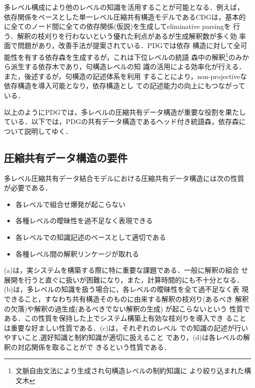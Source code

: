 多レベル構成により他のレベルの知識を活用することが可能となる．例えば，
依存関係をベースとした単一レベル圧縮共有構造モデルであるCDGは，基本的
に全てのノード間に全ての依存関係(仮説)を生成してeliminative parsingを
行う．解釈の枝刈りを行わないという優れた利点があるが生成解釈数が多く効
率面で問題があり，改善手法が提案されている\cite{Harper99}．PDGでは依存
構造に対して全可能性を有する依存森を生成するが，これは下位レベルの統語
森中の解釈\footnote{文脈自由文法により生成され句構造レベルの制約知識に
より絞り込まれた構文木}のみから派生する依存木であり，句構造レベルの知
識の活用による効率化が行える．また，後述するが，句構造の記述体系を利用
することにより，non-projectiveな依存構造を導入可能となり，依存構造とし
ての記述能力の向上にもつながっている．

以上のようにPDGでは，多レベルの圧縮共有データ構造が重要な役割を果たし
ている．以下では，PDGの共有データ構造であるヘッド付き統語森，依存森に
ついて説明してゆく．


\subsection{圧縮共有データ構造の要件}\label{sec:PrerequisitesForPackedSharedDataStructure}

多レベル圧縮共有データ結合モデルにおける圧縮共有データ構造には次の性質
が必要である．
\begin{itemize}
\item[(a)] 各レベルで組合せ爆発が起こらない
\item[(b)] 各種レベルの曖昧性を過不足なく表現できる
\item[(c)] 各レベルでの知識記述のベースとして適切である
\item[(d)] 各種レベル間の解釈リンケージが取れる
\end{itemize}
(a)は，実システムを構築する際に特に重要な課題である．一般に解釈の組合
せ展開を行うと直ぐに扱いが困難になり，また，計算時間的にも不十分となる．
(b)は，多レベルの知識を扱う場合に，各レベルの曖昧性を全て過不足なく表
現できること，すなわち共有構造そのものに由来する解釈の枝刈り(あるべき
解釈の欠落)や解釈の過生成(あるべきでない解釈の生成) が起こらないという
性質である．この性質を保持した上でシステム構築上有効な枝刈りを導入でき
ることは重要な好ましい性質である．(c)は，それぞれのレベル
での知識の記述が行いやすいこと,選好知識と制約知識が適切に扱えること
であり\cite{Hirakawa02_j}，(d)は各レベルの解釈の対応関係を取ることがで
きるという性質である．

